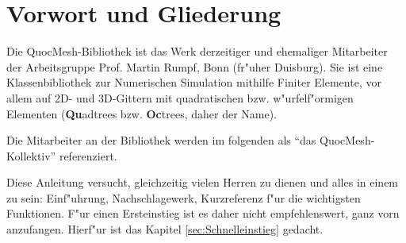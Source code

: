 \documentclass [twoside, a4paper, 12pt] {scrbook}
\begin{document}
\chapter*{Vorwort und Gliederung}

Die QuocMesh-Bibliothek ist das Werk derzeitiger und ehemaliger Mitarbeiter
der Arbeitsgruppe Prof. Martin Rumpf, Bonn (fr"uher Duisburg). Sie ist eine
Klassenbibliothek zur Numerischen Simulation mithilfe Finiter Elemente,
vor allem auf 2D- und 3D-Gittern mit quadratischen bzw. w"urfelf"ormigen
Elementen (\textbf{Qu}adtrees bzw. \textbf{Oc}trees, daher der Name).

Die Mitarbeiter an der Bibliothek werden im folgenden als "`das QuocMesh-%
Kollektiv"' referenziert.

Diese Anleitung versucht, gleichzeitig vielen Herren zu dienen und alles in
einem zu sein: Einf"uhrung, Nachschlagewerk, Kurzreferenz f"ur die wichtigsten
Funktionen. F"ur einen Ersteinstieg ist es daher nicht empfehlenswert,
ganz vorn anzufangen. Hierf"ur ist das Kapitel \ref{sec:Schnelleinstieg} gedacht.

\tableofcontents









\end{document}
